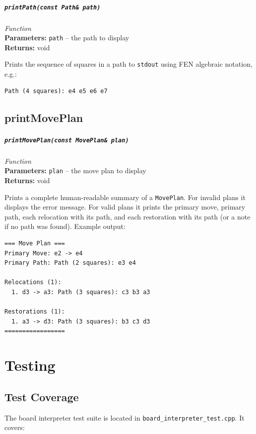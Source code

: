 \documentclass[11pt,a4paper]{report}
\newcommand{\function}[4]{%
    \paragraph{\texttt{#1}} \hfill \textit{#2}\\
    \textbf{Parameters:} #3\\
    \textbf{Returns:} #4
}
\begin{document}
\function{printPath(const Path\& path)}{Function}{\texttt{path} -- the path to display}{void}

Prints the sequence of squares in a path to \texttt{stdout} using FEN algebraic notation, e.g.:

\begin{lstlisting}
Path (4 squares): e4 e5 e6 e7
\end{lstlisting}

\section{printMovePlan}

\function{printMovePlan(const MovePlan\& plan)}{Function}{\texttt{plan} -- the move plan to display}{void}

Prints a complete human-readable summary of a \texttt{MovePlan}. For invalid plans it displays the error message. For valid plans it prints the primary move, primary path, each relocation with its path, and each restoration with its path (or a note if no path was found). Example output:

\begin{lstlisting}
=== Move Plan ===
Primary Move: e2 -> e4
Primary Path: Path (2 squares): e3 e4

Relocations (1):
  1. d3 -> a3: Path (3 squares): c3 b3 a3

Restorations (1):
  1. a3 -> d3: Path (3 squares): b3 c3 d3
=================
\end{lstlisting}

\chapter{Testing}

\section{Test Coverage}

The board interpreter test suite is located in \texttt{board\_interpreter\_test.cpp}. It covers:
\end{document}
